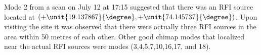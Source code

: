 \documentclass[a4paper,12pt]{article}
\begin{document}
                                                                                                                                                                                                                                                                                                                                                                                                                                                                                                                                                                                                                                                                                                                                                                                                                                                                                                          Mode 2 from a scan on July 12 at 17:15 suggested that there was an RFI source located at $(+\unit{19.137867}{\degree},+\unit{74.145737}{\degree})$. Upon visiting the site it was observed that there were actually three RFI sources in the area within 50 metres of each other. Other good chimap modes that localized near the actual RFI sources were modes (3,4,5,7,10,16,17, and 18).
\end{document}
